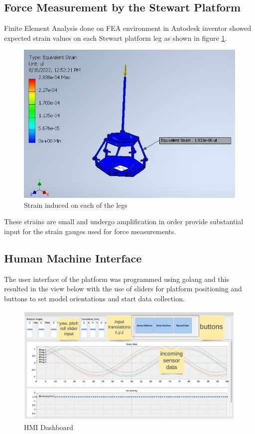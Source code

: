 \subsection{Force Measurement by the Stewart Platform}
Finite Element Analysis done on FEA environment in Autodesk inventor showed expected strain values on each
Stewart platform leg as shown in figure \ref{strain1}.

\begin{center}
	\begin{figure}[H]
		\centering
		\includegraphics[width=0.6\linewidth]{Figures/Equivalent}
		\caption[Equivalent strain]{Strain induced on each of the legs}
		\label{strain1}
	\end{figure}
\end{center}
These strains are small and undergo amplification in order provide substantial input for the strain gauges used for force measurements.

\subsection{Human Machine Interface}
The user interface of the platform was programmed using golang and this resulted in the view below with the use of sliders for platform positioning and buttons to set model orientations and start data collection.
\begin{center}
	\begin{figure}[H]
		\centering
		\includegraphics[width=1\linewidth]{Figures/hmi}
		\caption[HMI Dashboard]{HMI Dashboard}
	\end{figure}
\end{center}

